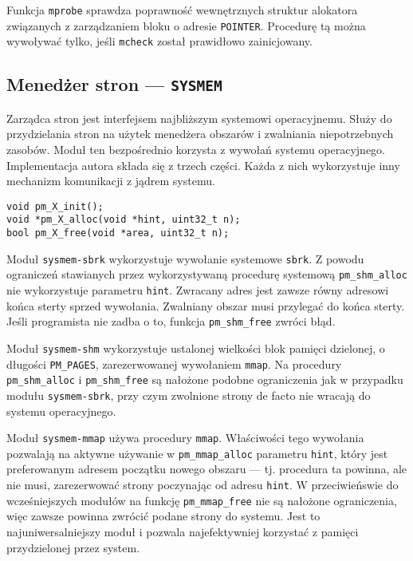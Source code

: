 \documentclass[12pt,a4paper,titlepage,twoside]{mwart}
\begin{document}
Funkcja \texttt{mprobe} sprawdza poprawność wewnętrznych struktur alokatora
związanych z zarządzaniem bloku o adresie \texttt{POINTER}. Procedurę tą można
wywoływać tylko, jeśli \texttt{mcheck} został prawidłowo zainicjowany.

\newpage

\subsection{Menedżer stron --- \texttt{SYSMEM}}

Zarządca stron jest interfejsem najbliższym systemowi operacyjnemu. Służy do
przydzielania stron na użytek menedżera obszarów i zwalniania niepotrzebnych
zasobów. Moduł ten bezpośrednio korzysta z wywołań systemu operacyjnego.
Implementacja autora składa się z trzech części. Każda z nich wykorzystuje inny
mechanizm komunikacji z jądrem systemu. 

\vspace{2ex}
\begin{lstlisting}[caption={Prototypy funkcji menedżera stron ($X \in \{sbrk, mmap, shm\}$).}]
void pm_X_init();
void *pm_X_alloc(void *hint, uint32_t n);
bool pm_X_free(void *area, uint32_t n);
\end{lstlisting}

Moduł \texttt{sysmem-sbrk} wykorzystuje wywołanie systemowe \texttt{sbrk}. Z
powodu ograniczeń stawianych przez wykorzystywaną procedurę systemową
\texttt{pm\_shm\_alloc} nie wykorzystuje parametru \texttt{hint}. Zwracany
adres jest zawsze równy adresowi końca sterty sprzed wywołania. Zwalniany
obszar musi przylegać do końca sterty. Jeśli programista nie zadba o to,
funkcja \texttt{pm\_shm\_free} zwróci błąd.

Moduł \texttt{sysmem-shm} wykorzystuje ustalonej wielkości blok pamięci
dzielonej, o długości \texttt{PM\_PAGES}, zarezerwowanej wywołaniem
\texttt{mmap}. Na procedury \texttt{pm\_shm\_alloc} i \texttt{pm\_shm\_free} są
nałożone podobne ograniczenia jak w przypadku modułu \texttt{sysmem-sbrk}, przy
czym zwolnione strony de facto nie wracają do systemu operacyjnego.

Moduł \texttt{sysmem-mmap} używa procedury \texttt{mmap}. Właściwości tego
wywołania pozwalają na aktywne używanie w \texttt{pm\_mmap\_alloc} parametru
\texttt{hint}, który jest preferowanym adresem początku nowego obszaru --- tj.
procedura ta powinna, ale nie musi, zarezerwować strony poczynając od adresu
\texttt{hint}. W przeciwieńswie do wcześniejszych modułów na funkcję
\texttt{pm\_mmap\_free} nie są nałożone ograniczenia, więc zawsze powinna
zwrócić podane strony do systemu. Jest to najuniwersalniejszy moduł i pozwala
najefektywniej korzystać z pamięci przydzielonej przez system.
\end{document}
